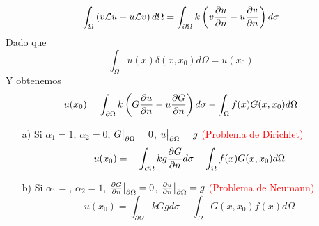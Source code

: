 \documentclass[../main]{subfiles}
\begin{document}
    \begin{equation}
        \int_{\Omega} \left( v\mathcal{L}u-u\mathcal{L}v\right) d\Omega = \int_{\partial \Omega} k\left( v \pdv{u}{n}-u\pdv{v}{n}\right) d\sigma
    \end{equation}
    Dado que
    \begin{equation}
        \int_{\Omega} u(x) \delta(x,x_0) d\Omega = u(x_0)
    \end{equation}
    Y obtenemos
    \begin{equation}
        u(x_0)=\int_{\partial \Omega} k\left( G\pdv{u}{n}-u\pdv{G}{n}\right)d\sigma-\int_{\Omega} f(x)G(x,x_0)d\Omega
    \end{equation}
    \begin{itemize}
        \item[a)] Si $\alpha_1=1$, $\alpha_2=0$, $G\big{|}_{\partial \Omega}=0$, $u\big{|}_{\partial \Omega}=g$ \textcolor{red}{(Problema de Dirichlet)} 
        \begin{equation}
            u(x_0)=-\int_{\partial \Omega} kg\pdv{G}{n}d\sigma-\int_{\Omega} f(x)G(x,x_0)d\Omega
        \end{equation}
        \item[b)] Si $\alpha_1=$, $\alpha_2=1$, $\pdv{G}{n}\big{|}_{\partial \Omega}=0$, $\pdv{u}{n}\big{|}_{\partial \Omega}=g$ \textcolor{red}{(Problema de Neumann)}
        \begin{equation}
            u(x_0)=\int_{\partial \Omega} kGgd\sigma-\int_{\Omega} G(x,x_0)f(x)d\Omega
        \end{equation}
    \end{itemize}
\end{document}
